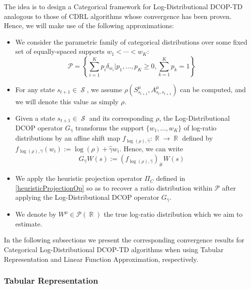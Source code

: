 \documentclass[12pt,a4paper,openright,twoside]{article}
\DeclareMathOperator*{\R}{\mathbb{R}}
\DeclareMathOperator*{\Sspace}{\mathcal{S}}
\numberwithin{equation}{section}
\theoremstyle{definition}
\theoremstyle{remark}
\theoremstyle{plain}
\begin{document}
The idea is to design a Categorical framework for Log-Distributional DCOP-TD analogous to those of CDRL algorithms whose convergence has been proven. Hence, we will make use of the following approximations:
\begin{itemize}
	\item We consider the parametric family of categorical distributions over some fixed set of equally-spaced supports $w_1 < \cdots < w_K$:
		\begin{equation*}
			\mathcal{P} = \left\{ \sum_{i=1}^{K} p_i \delta_{w_i} \Big| p_1, \dots , p_K \geq 0, \sum_{k=1}^{K} p_k = 1 \right\}
		\end{equation*}
		
	\item For any state $s_{t+1} \in \Sspace$, we assume $\rho(S^{\mu}_{s_{t+1}},A^{\mu}_{s_{t},s_{t+1}})$ can be computed, and we will denote this value as simply $\rho$.
	
	\item Given a state $s_{t+1} \in \Sspace$ and its corresponding $\rho$, the Log-Distributional DCOP operator $G_{\hat{\gamma}}$ transforms the support $\{w_1,\dots,w_K\}$ of log-ratio distributions by an affine shift map $f_{\log(\rho),\hat{\gamma}} : \R \rightarrow \R$ defined by $f_{\log(\rho),\hat{\gamma}}(w_i) := \log(\rho) + \hat{\gamma} w_i$. Hence, we can write
		\begin{equation*}
			G_{\hat{\gamma}} W(s) := (f_{\log(\rho),\hat{\gamma}})_{\#} W(s)
		\end{equation*} 
	
	\item We apply the heuristic projection operator $\Pi_C$ defined in \ref{heuristicProjectionOp} so as to recover a ratio distribution within $\mathcal{P}$ after applying the Log-Distributional DCOP operator $G_{\hat{\gamma}}$.

	\item We denote by $W^\mu \in \mathscr{P}(\R)$ the true log-ratio distribution which we aim to estimate.
\end{itemize}


In the following subsections we present the corresponding convergence results for Categorical Log-Distributional DCOP-TD algorithms when using Tabular Representation and Linear Function Approximation, respectively. 






\subsubsection{Tabular Representation}
\end{document}
